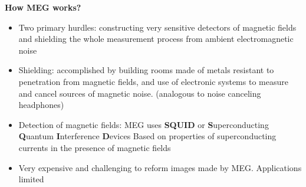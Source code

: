 \documentclass{article}
\begin{document}
\noindent \textbf{How MEG works?}
\begin{itemize}
    \item Two primary hurdles: constructing very sensitive detectors of magnetic fields and shielding the whole measurement process from ambient electromagnetic noise
    \item Shielding: accomplished by building rooms made of metals resistant to penetration from magnetic fields, and use of electronic systems to measure and cancel sources of magnetic noise. (analogous to noise canceling headphones) 
    \item Detection of magnetic fields: MEG uses \textbf{SQUID} or \textbf{S}uperconducting \textbf{Q}uantum \textbf{I}nterference \textbf{D}evices
    \subitem Based on properties of superconducting currents in the presence of magnetic fields
    \item Very expensive and challenging to reform images made by MEG. Applications limited
\end{itemize}
\end{document}
